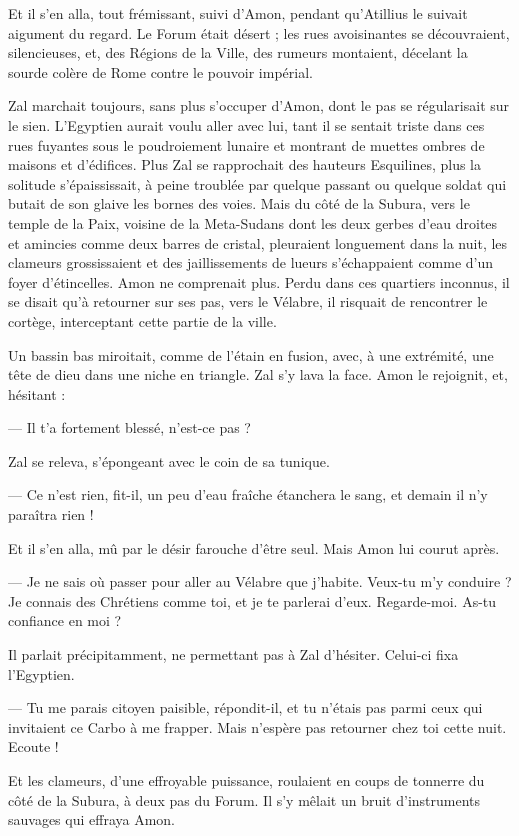 \documentclass[a4paper, 11pt, oneside, polutonikogreek, french]{article}
\begin{document}
Et il s'en alla, tout frémissant, suivi d'Amon, pendant qu'Atillius le suivait aigument du regard. Le Forum était désert ; les rues avoisinantes se découvraient, silencieuses, et, des Régions de la Ville, des rumeurs montaient, décelant la sourde colère de Rome contre le pouvoir impérial.

Zal marchait toujours, sans plus s'occuper d'Amon, dont le pas se régularisait sur le sien. L'Egyptien aurait voulu aller avec lui, tant il se sentait triste dans ces rues fuyantes sous le poudroiement lunaire et montrant de muettes ombres de maisons et d'édifices. Plus Zal se rapprochait des hauteurs Esquilines, plus la solitude s'épaississait, à peine troublée par quelque passant ou quelque soldat qui butait de son glaive les bornes des voies. Mais du côté de la Subura, vers le temple de la Paix, voisine de la Meta-Sudans dont les deux gerbes d'eau droites et amincies comme deux barres de cristal, pleuraient longuement dans la nuit, les clameurs grossissaient et des jaillissements de lueurs s'échappaient comme d'un foyer d'étincelles. Amon ne comprenait plus. Perdu dans ces quartiers inconnus, il se disait qu'à retourner sur ses pas, vers le Vélabre, il risquait de rencontrer le cortège, interceptant cette partie de la ville.

Un bassin bas miroitait, comme de l'étain en fusion, avec, à une extrémité, une tête de dieu dans une niche en triangle. Zal s'y lava la face. Amon le rejoignit, et, hésitant :

--- Il t'a fortement blessé, n'est-ce pas ?

Zal se releva, s'épongeant avec le coin de sa tunique.

--- Ce n'est rien, fit-il, un peu d'eau fraîche étanchera le sang, et demain il n'y paraîtra rien !

Et il s'en alla, mû par le désir farouche d'être seul. Mais Amon lui courut après.

--- Je ne sais où passer pour aller au Vélabre que j'habite. Veux-tu m'y conduire ? Je connais des Chrétiens comme toi, et je te parlerai d'eux. Regarde-moi. As-tu confiance en moi ?

Il parlait précipitamment, ne permettant pas à Zal d'hésiter. Celui-ci fixa l'Egyptien.

--- Tu me parais citoyen paisible, répondit-il, et tu n'étais pas parmi ceux qui invitaient ce Carbo à me frapper. Mais n'espère pas retourner chez toi cette nuit. Ecoute !

Et les clameurs, d'une effroyable puissance, roulaient en coups de tonnerre du côté de la Subura, à deux pas du Forum. Il s'y mêlait un bruit d'instruments sauvages qui effraya Amon.
\end{document}
